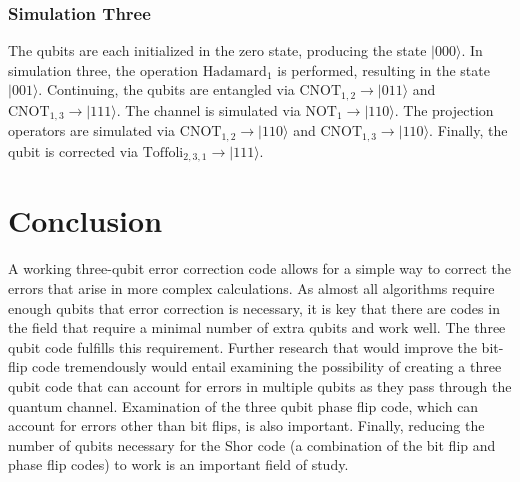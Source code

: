 \documentclass{article}
\begin{document}
\subsubsection{Simulation Three}
The qubits are each initialized in the zero state, producing the state $|000\rangle$. In simulation three, the operation $\mathrm{Hadamard}_1$ is performed, resulting in the state $|001\rangle$. Continuing, the qubits are entangled via $\mathrm{CNOT}_{1,2}\to|011\rangle$ and $\mathrm{CNOT}_{1,3}\to|111\rangle$. The channel is simulated via $\mathrm{NOT}_1\to|110\rangle$. The projection operators are simulated via $\mathrm{CNOT}_{1,2}\to|110\rangle$ and $\mathrm{CNOT}_{1,3}\to|110\rangle$. Finally, the qubit is corrected via $\mathrm{Toffoli}_{2,3,1}\to|111\rangle$.

\section{Conclusion}
A working three-qubit error correction code allows for a simple way to correct the errors that arise in more complex calculations. As almost all algorithms require enough qubits that error correction is necessary, it is key that there are codes in the field that require a minimal number of extra qubits and work well. The three qubit code fulfills this requirement. Further research that would improve the bit-flip code tremendously would entail examining the possibility of creating a three qubit code that can account for errors in multiple qubits as they pass through the quantum channel. Examination of the three qubit phase flip code, which can account for errors other than bit flips\cite{qcqi}, is also important. Finally, reducing the number of qubits necessary for the Shor code (a combination of the bit flip and phase flip codes) to work is an important field of study.

\printbibliography
\end{document}

